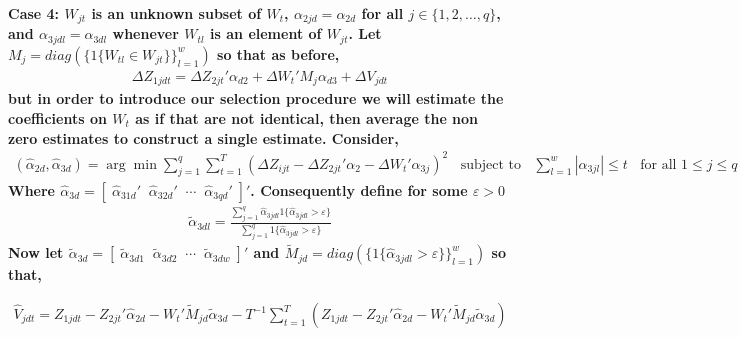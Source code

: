 \documentclass[10pt]{article}
\begin{document}
\noindent \bf Case 4: \rm $W_{jt}$ is an unknown subset of $W_{t}$, $\alpha_{2jd} = \alpha_{2d}$ for all $j \in \{1,2, \ldots,q\}$, and $\alpha_{3jdl} = \alpha_{3dl}$ whenever $W_{tl}$ is an element of $W_{jt}$. Let $M_j = diag(\{1\{ W_{tl} \in W_{jt}\} \}_{l=1}^w)$ so that as before,
%
\begin{align*} 
\Delta Z_{1jdt} =\Delta Z_{2jt}' \alpha_{d2} + \Delta W_{t}'M_j \alpha_{d3} + \Delta V_{jdt}
\end{align*}
but in order to introduce our selection procedure we will estimate the coefficients on $W_{t}$ as if that are not identical, then average the non zero estimates to construct a single estimate.  Consider, 
\begin{align*} 
(\hat{\alpha}_{2d},\hat{\alpha}_{3d})  = \arg \min \sum_{j=1}^q\sum_{t=1}^T\left( \Delta Z_{ijt} -  \Delta Z_{2jt}'\alpha_{2} - \Delta W_{t}'\alpha_{3j} \right)^2 \;\; \text{ subject to } \;\; \sum_{l=1}^w|\alpha_{3jl}| \leq t \;\;  \text{ for all } 1 \leq j \leq q
\end{align*}
Where $\hat{\alpha}_{3d} = [\; \hat{\alpha}_{31d}' \;\; \hat{\alpha}_{32d}'  \;\; \cdots \;\; \hat{\alpha}_{3qd}' \;]'  $.
Consequently define for some $\varepsilon > 0$ 
\begin{align*} 
\tilde{\alpha}_{3dl} = \frac{\sum_{j=1}^q \hat{\alpha}_{3jdl} 1\{ \hat{\alpha}_{3jdl} > \varepsilon\} }{\sum_{j=1}^q1\{ \hat{\alpha}_{3jdl} > \varepsilon\}}
\end{align*}
Now let $\tilde{\alpha}_{3d} = [ \; \tilde{\alpha}_{3d1} \;\; \tilde{\alpha}_{3d2} \;\; \cdots \;\; \tilde{\alpha}_{3dw}  \; ]'$ and $\tilde{M}_{jd} = diag( \{1\{\hat{\alpha}_{3jdl} > \varepsilon\} \}_{l=1}^w)$ so that, 

\begin{align*}
\hat{V}_{jdt} = Z_{1jdt} - Z_{2jt}'\hat{\alpha}_{2d} - W_{t}'\tilde{M}_{jd}\tilde{\alpha}_{3d} - T^{-1}\sum_{t=1}^T  (Z_{1jdt} - Z_{2jt}'\hat{\alpha}_{2d} - W_{t}'\tilde{M}_{jd}\tilde{\alpha}_{3d}) 
\end{align*}





 

 
\end{document}
